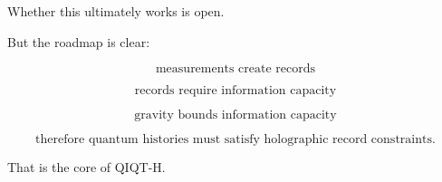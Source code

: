 \documentclass[11pt,a4paper]{article}
\begin{document}
Whether this ultimately works is open.

But the roadmap is clear:

\[
\text{measurements create records}
\]

\[
\text{records require information capacity}
\]

\[
\text{gravity bounds information capacity}
\]

\[
\text{therefore quantum histories must satisfy holographic record constraints}.
\]

That is the core of QIQT-H.
\end{document}
